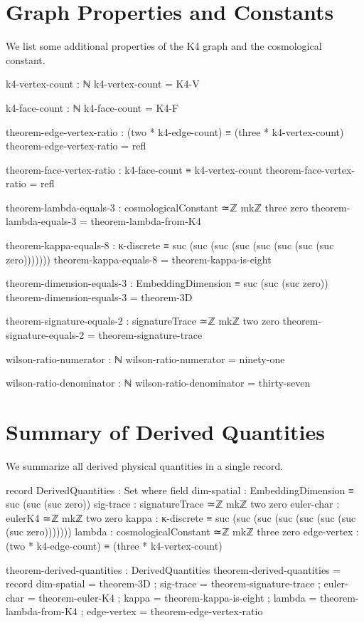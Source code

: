 \documentclass[11pt,a4paper]{book}
\begin{document}
\section{Graph Properties and Constants}

We list some additional properties of the K4 graph and the cosmological constant.

\begin{code}
k4-vertex-count : ℕ
k4-vertex-count = K4-V

k4-face-count : ℕ
k4-face-count = K4-F

theorem-edge-vertex-ratio : (two * k4-edge-count) ≡ (three * k4-vertex-count)
theorem-edge-vertex-ratio = refl

theorem-face-vertex-ratio : k4-face-count ≡ k4-vertex-count
theorem-face-vertex-ratio = refl

theorem-lambda-equals-3 : cosmologicalConstant ≃ℤ mkℤ three zero
theorem-lambda-equals-3 = theorem-lambda-from-K4

theorem-kappa-equals-8 : κ-discrete ≡ suc (suc (suc (suc (suc (suc (suc (suc zero)))))))
theorem-kappa-equals-8 = theorem-kappa-is-eight

theorem-dimension-equals-3 : EmbeddingDimension ≡ suc (suc (suc zero))
theorem-dimension-equals-3 = theorem-3D

theorem-signature-equals-2 : signatureTrace ≃ℤ mkℤ two zero
theorem-signature-equals-2 = theorem-signature-trace

wilson-ratio-numerator : ℕ
wilson-ratio-numerator = ninety-one

wilson-ratio-denominator : ℕ  
wilson-ratio-denominator = thirty-seven
\end{code}

\section{Summary of Derived Quantities}

We summarize all derived physical quantities in a single record.

\begin{code}
record DerivedQuantities : Set where
  field
    dim-spatial    : EmbeddingDimension ≡ suc (suc (suc zero))
    sig-trace      : signatureTrace ≃ℤ mkℤ two zero
    euler-char     : eulerK4 ≃ℤ mkℤ two zero
    kappa          : κ-discrete ≡ suc (suc (suc (suc (suc (suc (suc (suc zero)))))))
    lambda         : cosmologicalConstant ≃ℤ mkℤ three zero
    edge-vertex    : (two * k4-edge-count) ≡ (three * k4-vertex-count)

theorem-derived-quantities : DerivedQuantities
theorem-derived-quantities = record
  { dim-spatial  = theorem-3D
  ; sig-trace    = theorem-signature-trace
  ; euler-char   = theorem-euler-K4
  ; kappa        = theorem-kappa-is-eight
  ; lambda       = theorem-lambda-from-K4
  ; edge-vertex  = theorem-edge-vertex-ratio
  }
\end{code}
\end{document}
